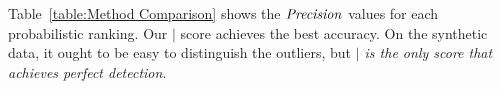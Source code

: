 \documentclass[conference]{IEEEtran}
\begin{document}
						
						Table~\ref{table:Method Comparison} shows the $\it{Precision}$ values for each probabilistic ranking. Our $\mid$ score achieves the best accuracy. On the synthetic data, it ought to be easy to distinguish the outliers, but {\em $\mid$ is the only score that achieves perfect detection}. %
%								
%									
%										
%								
%								
%									
\end{document}

